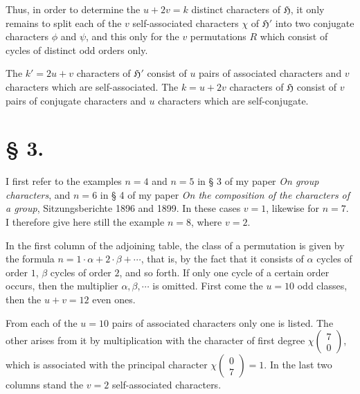 \documentclass[11pt]{article}
\newcommand{\Hgr}{\mathfrak{H}}
\newcommand{\ch}[2]{\left(\begin{smallmatrix}#1\\#2\end{smallmatrix}\right)}
\begin{document}
Thus, in order to determine the $u+2v=k$ distinct characters of $\Hgr$, it only remains to split each of the $v$ self-associated characters $\chi$ of $\Hgr'$ into two conjugate characters $\phi$ and $\psi$, and this only for the $v$ permutations $R$ which consist of cycles of distinct odd orders only.

The $k'=2u+v$ characters of $\Hgr'$ consist of $u$ pairs of associated characters and $v$ characters which are self-associated. The $k=u+2v$ characters of $\Hgr$ consist of $v$ pairs of conjugate characters and $u$ characters which are self-conjugate.

\section*{§ 3.}

I first refer to the examples $n=4$ and $n=5$ in § 3 of my paper \emph{On group characters}, and $n=6$ in § 4 of my paper \emph{On the composition of the characters of a group}, Sitzungsberichte 1896 and 1899. In these cases $v=1$, likewise for $n=7$. I therefore give here still the example $n=8$, where $v=2$.

In the first column of the adjoining table, the class of a permutation is given by the formula $n=1\cdot\alpha+2\cdot\beta+\cdots$, that is, by the fact that it consists of $\alpha$ cycles of order $1$, $\beta$ cycles of order $2$, and so forth. If only one cycle of a certain order occurs, then the multiplier $\alpha,\beta,\cdots$ is omitted. First come the $u=10$ odd classes, then the $u+v=12$ even ones.

From each of the $u=10$ pairs of associated characters only one is listed. The other arises from it by multiplication with the character of first degree $\chi\ch{7}{0}$, which is associated with the principal character $\chi\ch{0}{7}=1$. In the last two columns stand the $v=2$ self-associated characters.
\end{document}

